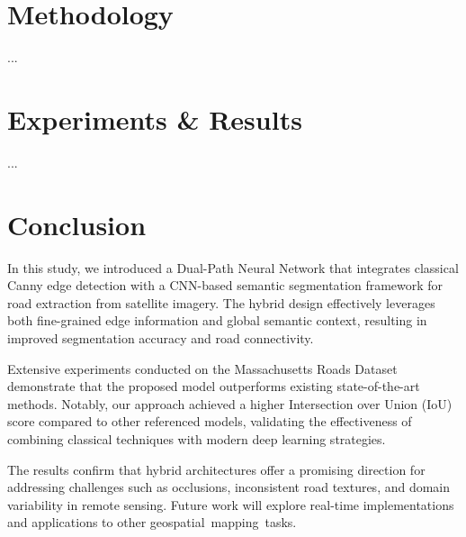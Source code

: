 \documentclass[11pt]{article}
\begin{document}
\begin{multicols}{2}
\section{Methodology}
...

\section{Experiments & Results}
...

\section{Conclusion}
In this study, we introduced a Dual-Path Neural Network that integrates classical Canny edge detection with a CNN-based semantic segmentation framework for road extraction from satellite imagery. The hybrid design effectively leverages both fine-grained edge information and global semantic context, resulting in improved segmentation accuracy and road connectivity.

Extensive experiments conducted on the Massachusetts Roads Dataset demonstrate that the proposed model outperforms existing state-of-the-art methods. Notably, our approach achieved a higher Intersection over Union (IoU) score compared to other referenced models, validating the effectiveness of combining classical techniques with modern deep learning strategies.

The results confirm that hybrid architectures offer a promising direction for addressing challenges such as occlusions, inconsistent road textures, and domain variability in remote sensing. Future work will explore real-time implementations and applications to other geospatial mapping tasks.

\end{multicols}


\end{document}
